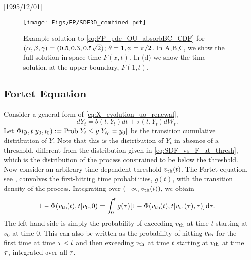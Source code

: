 \NeedsTeXFormat{LaTeX2e}[1995/12/01] \documentclass[10pt]{bmc_article}
\newenvironment{bmcformat}{\begin{raggedright}\baselineskip20pt\sloppy\setboolean{publ}{false}}{\end{raggedright}\baselineskip20pt\sloppy}
\begin{document}
\begin{bmcformat}
\begin{figure}[h]
\begin{center}
\texttt{[image: Figs/FP/SDF3D\_combined.pdf]} 
\caption{Example solution to \cref{eq:FP_pde_OU_absorbBC_CDF} for
$({\alpha},{\beta},{\gamma }) = (0.5, 0.3, 0.5\sqrt{2})$; ${\theta}= 1, \phi = \pi / 2$.
In A,B,C, we show the full solution in space-time $F(x,t)$. In (d) we show
the time solution at the upper boundary, $F(1,t)$.} 
\label{fig:FP_pde_OU_absorbBC_CDF} 
\end{center}
\end{figure}

\subsection{Fortet Equation}
\label{sec:fortet_estimation}
Consider a general form of \cref{eq:X_evolution_uo_renewal}, $$ dY_t =
b(t,Y_t)dt + \sigma(t,Y_t) dW_t. $$ Let ${\Phi}(y,t| y_0, t_0) :=   \operatorname{Prob}[Y_t \leq
y| Y_{t_0} = y_0]$ be the transition cumulative distribution of $Y$. Note that
this is the distribution of $Y_t$ in absence of a threshold, different from the
distribution given in \cref{eq:SDF_vs_F_at_thresh},
 which is the distribution 
of the process constrained to be below the threshold. 
Now consider an arbitrary time-dependent threshold ${ v_{\textrm{th} } }(t)$. The Fortet
equation, see \cite{Fortet1943}, convolves the first-hitting time probabilities,
$g(t)$, with the transition density of the process. Integrating
over $(-\infty, { v_{\textrm{th} } }(t))$, we obtain
\begin{equation}
1 - {\Phi}({ v_{\textrm{th} } }(t), t|v_0, 0) =
\int_0^t g(\tau) [1-{\Phi} ({ v_{\textrm{th} } }(t),  t| { v_{\textrm{th} } }({\tau}), {\tau})] \, \mathrm{d} {\tau}.
\label{eq:Fortet_moving_vth}
\end{equation}
The left hand side is simply the probability of exceeding ${ v_{\textrm{th} } }$ at time
$t$ starting at $v_0$ at time $0$. This can also be written as the probability
of hitting ${ v_{\textrm{th} } }$ for the first time at time ${\tau} < t$ and then exceeding
${ v_{\textrm{th} } }$ at time $t$ starting at ${ v_{\textrm{th} } }$ at time ${\tau}$, integrated over all ${\tau}$.


\end{bmcformat}
\end{document}
